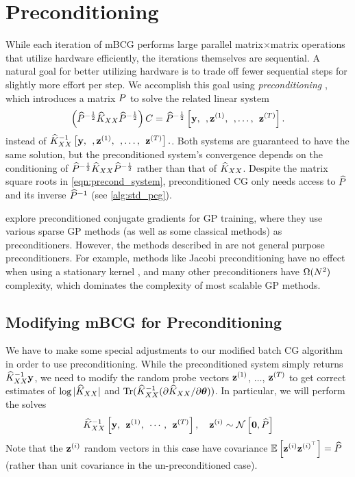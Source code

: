 \section{Preconditioning}
\label{sec:preconditioning}

While each iteration of mBCG performs large parallel matrix$\times$matrix operations that utilize hardware efficiently, the iterations themselves are sequential.
A natural goal for better utilizing hardware is to trade off fewer sequential steps for slightly more effort per step.
We accomplish this goal using \emph{preconditioning} \citep[e.g.][]{demmel1997applied,saad2003iterative,van2003iterative,golub2012matrix}, which introduces a matrix $P$ to solve the related linear system
\begin{equation}
  \left( \widehat{P}^{- \frac 1 2} \widehat{K}_{XX} \widehat{P}^{- \frac 1 2}\right) C = \widehat{P}^{- \frac 1 2} \left[ \mathbf{y}, \:\:, \mathbf{z}^{(1)}, \:\:, \ldots, \:\: \mathbf{z}^{(T)} \right].
  \label{eqn:precond_system}
\end{equation}
instead of $\widehat{K}_{XX}^{-1} \left[  \mathbf{y}, \:\:, \mathbf{z}^{(1)}, \:\:, \ldots, \:\: \mathbf{z}^{(T)} \right].$.
Both systems are guaranteed to have the same solution, but the preconditioned system's convergence depends on the conditioning of $\widehat{P}^{- \frac 1 2} \widehat{K}_{XX} \widehat{P}^{- \frac 1 2}$ rather than that of $\widehat{K}_{XX}$.
Despite the matrix square roots in \cref{eqn:precond_system}, preconditioned CG only needs access to $\widehat{P}$ and its inverse $\widehat{P}^{-1}$ (see \cref{alg:std_pcg}).

\citet{cutajar2016preconditioning} explore preconditioned conjugate gradients for GP training, where they use various sparse GP methods (as well as some classical methods) as preconditioners.
However, the methods described in \citet{cutajar2016preconditioning} are not general purpose preconditioners.
For example, methods like Jacobi preconditioning have no effect when using a stationary kernel \cite{cutajar2016preconditioning,wilson2015thoughts}, and many other preconditioners have $\bigomega{N^{2}}$ complexity, which dominates the complexity of most scalable GP methods.



\subsection{Modifying mBCG for Preconditioning}
\label{sec:precond_requirements}
We have to make some special adjustments to our modified batch CG algorithm in order to use preconditioning.
While the preconditioned system simply returns $\widehat{K}_{XX}^{-1} \mathbf{y}$, we need to modify the random probe vectors $\mathbf{z}^{(1)}$, $\ldots$, $\mathbf{z}^{(T)}$ to get correct estimates of $\log \vert \widehat{K}_{XX} \vert$ and $\tr{ \trainK^{-1} ( \partial \trainK / \partial \btheta) }$.
In particular, we will perform the solves
%
\begin{equation}
  \label{eqn:mod_cg_call}
  \trainK^{-1} \left[ \by, \:\: \bz^{(1)}, \:\: \cdots, \:\: \bz^{(T)} \right], \quad \bz^{(i)} \sim \normaldist{\bzero}{\trainP}
\end{equation}
%
Note that the $\mathbf{z}^{(i)}$ random vectors in this case have covariance $\operatorname*{\mathbb{E}} \left[  \mathbf{z}^{(i)} \mathbf{z}^{(i)^\top}  \right] = \widehat{P}$ (rather than unit covariance in the un-preconditioned case).

